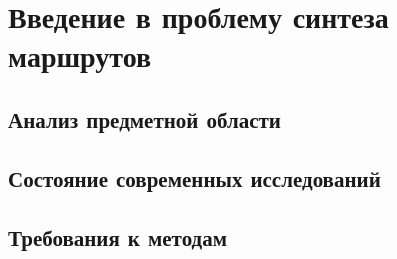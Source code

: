 \chapter{Введение в проблему синтеза маршрутов}
\section{Анализ предметной области}
\section{Состояние современных исследований}
\section{Требования к методам}

